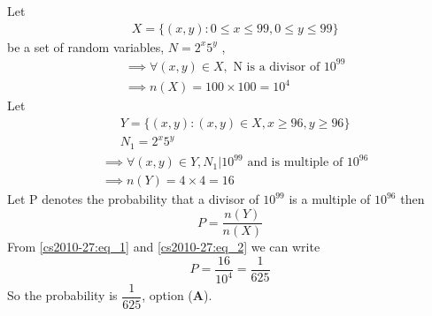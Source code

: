 Let 
\begin{align*}
& X= \{ (x,y) : 0\leq x \leq 99 ,0\leq y \leq 99 \}
\end{align*} 
be a set of random variables, $N=2^x5^y$ , 
\begin{align}
& \implies \forall (x,y) \in X, \text{ N is a divisor of } 10^{99}\\
&\implies n (X) = 100\times 100=10^4 \label{cs2010-27:eq_1}
\end{align}
Let 
\begin{align*}
&Y=\{(x,y) : (x,y)\in X , x \geq 96,y\geq 96\}\\
&N_1= 2^x5^y 
\end{align*}
\begin{align}
&\implies \forall (x,y) \in  Y ,N_1 | 10^{99} \text{ and is multiple of } 10^{96} \\
&\implies n(Y)=4\times 4=16 \label{cs2010-27:eq_2}
\end{align}
Let P denotes the probability that a divisor of $10^{99}$ is a multiple of $10^{96}$ then
$$P=\dfrac{n(Y)}{n(X)}$$
From \ref{cs2010-27:eq_1} and \ref{cs2010-27:eq_2} we can write
$$P=\dfrac{16}{10^4}=\dfrac{1}{625}$$
So the probability is $\dfrac{1}{625}$, option (\textbf{A}).